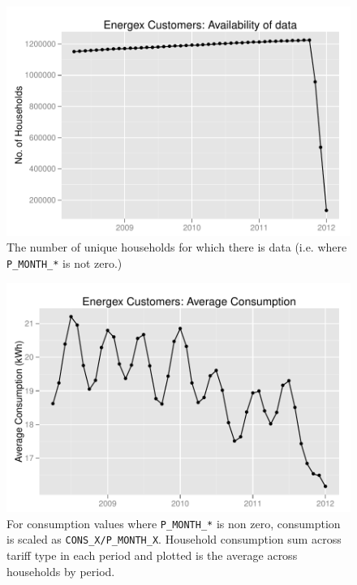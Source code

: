 \documentclass[a4paper,11pt]{article}
\begin{document}
\begin{figure}
\begin{center}
\includegraphics[width=1\textwidth]{figures/EnergexAvailData.pdf}
\caption{The number of unique households for which there is data (i.e.
where {\tt P\_MONTH\_*} is not zero.)}
\end{center}
\end{figure}

\begin{figure}
\begin{center}
\includegraphics[width=1\textwidth]{figures/EnergexAvgConsump.pdf}
\caption{For consumption values where {\tt P\_MONTH\_*} is non zero,
consumption is scaled as {\tt CONS\_X/P\_MONTH\_X}. Household consumption
sum across tariff type in each period and plotted is the average across
households by period.}
\end{center}
\end{figure}
\end{document}
